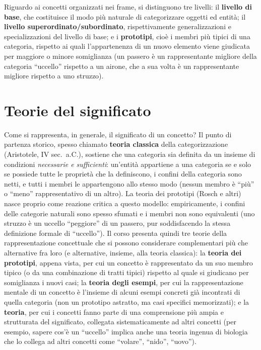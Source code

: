 \documentclass[11pt,a4paper]{report}
\begin{document}
Riguardo ai concetti organizzati nei frame, si distinguono tre livelli: il \textbf{livello di base}, che costituisce il modo più naturale di categorizzare oggetti ed entità; il \textbf{livello superordinato/subordinato}, rispettivamente generalizzazioni e specializzazioni del livello di base; e i \textbf{prototipi}, cioè i membri più tipici di una categoria, rispetto ai quali l'appartenenza di un nuovo elemento viene giudicata per maggiore o minore somiglianza (un passero è un rappresentante migliore della categoria ``uccello'' rispetto a un airone, che a sua volta è un rappresentante migliore rispetto a uno struzzo).

\section{Teorie del significato}

Come si rappresenta, in generale, il significato di un concetto? Il punto di partenza storico, spesso chiamato \textbf{teoria classica} della categorizzazione (Aristotele, IV sec.\ a.C.), sostiene che una categoria sia definita da un insieme di condizioni \emph{necessarie e sufficienti}: un'entità appartiene a una categoria se e solo se possiede tutte le proprietà che la definiscono, i confini della categoria sono netti, e tutti i membri le appartengono allo stesso modo (nessun membro è ``più'' o ``meno'' rappresentativo di un altro). La teoria dei prototipi (Rosch e altri) nasce proprio come reazione critica a questo modello: empiricamente, i confini delle categorie naturali sono spesso sfumati e i membri non sono equivalenti (uno struzzo è un uccello ``peggiore'' di un passero, pur soddisfacendo la stessa definizione formale di ``uccello''). Il corso presenta quindi tre teorie della rappresentazione concettuale che si possono considerare complementari più che alternative fra loro (e alternative, insieme, alla teoria classica): la \textbf{teoria dei prototipi}, appena vista, per cui un concetto è rappresentato da un suo membro tipico (o da una combinazione di tratti tipici) rispetto al quale si giudicano per somiglianza i nuovi casi; la \textbf{teoria degli esempi}, per cui la rappresentazione mentale di un concetto è l'insieme di alcuni esempi concreti già incontrati di quella categoria (non un prototipo astratto, ma casi specifici memorizzati); e la \textbf{teoria}, per cui i concetti fanno parte di una comprensione più ampia e strutturata del significato, collegata sistematicamente ad altri concetti (per esempio, sapere cos'è un ``uccello'' implica anche una teoria ingenua di biologia che lo collega ad altri concetti come ``volare'', ``nido'', ``uovo'').
\end{document}

